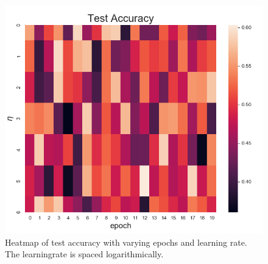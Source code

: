 \documentclass[a4paper,11pt,twocolumn]{article}
\begin{document}
\begin{figure}[h]
\centering
\includegraphics[scale=0.75]{Heatmap2}
\caption{Heatmap of test accuracy with varying epochs and learning rate. The learningrate is spaced logarithmically.}
\label{Heatmap2}
\end{figure}
\end{document}
